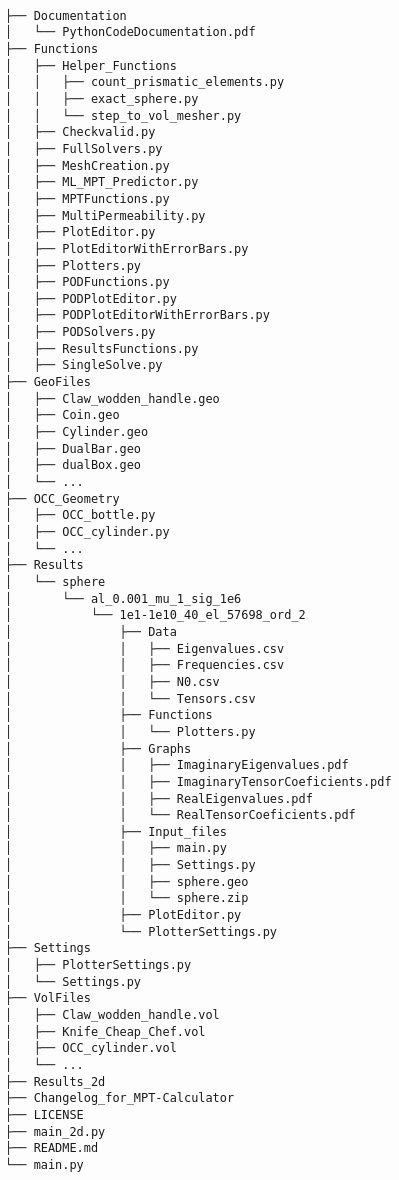 \clearpage
\begin{Verbatim}[fontsize=\footnotesize]

├── Documentation
│   └── PythonCodeDocumentation.pdf
├── Functions
│   ├── Helper_Functions
│   │   ├── count_prismatic_elements.py
│   │   ├── exact_sphere.py
│   │   └── step_to_vol_mesher.py
│   ├── Checkvalid.py
│   ├── FullSolvers.py
│   ├── MeshCreation.py
│   ├── ML_MPT_Predictor.py
│   ├── MPTFunctions.py
│   ├── MultiPermeability.py
│   ├── PlotEditor.py
│   ├── PlotEditorWithErrorBars.py
│   ├── Plotters.py
│   ├── PODFunctions.py
│   ├── PODPlotEditor.py
│   ├── PODPlotEditorWithErrorBars.py
│   ├── PODSolvers.py
│   ├── ResultsFunctions.py
│   ├── SingleSolve.py 
├── GeoFiles
│   ├── Claw_wodden_handle.geo
│   ├── Coin.geo
│   ├── Cylinder.geo
│   ├── DualBar.geo
│   ├── dualBox.geo
│   └── ...
├── OCC_Geometry
│   ├── OCC_bottle.py
│   ├── OCC_cylinder.py
│   └── ...
├── Results
│   └── sphere
│       └── al_0.001_mu_1_sig_1e6
│           └── 1e1-1e10_40_el_57698_ord_2
│               ├── Data
│               │   ├── Eigenvalues.csv
│               │   ├── Frequencies.csv
│               │   ├── N0.csv
│               │   └── Tensors.csv
│               ├── Functions
│               │   └── Plotters.py
│               ├── Graphs
│               │   ├── ImaginaryEigenvalues.pdf
│               │   ├── ImaginaryTensorCoeficients.pdf
│               │   ├── RealEigenvalues.pdf
│               │   └── RealTensorCoeficients.pdf
│               ├── Input_files
│               │   ├── main.py
│               │   ├── Settings.py
│               │   ├── sphere.geo
│               │   └── sphere.zip
│               ├── PlotEditor.py
│               └── PlotterSettings.py
├── Settings
│   ├── PlotterSettings.py
│   └── Settings.py
├── VolFiles
│   ├── Claw_wodden_handle.vol
│   ├── Knife_Cheap_Chef.vol
│   ├── OCC_cylinder.vol
│   └── ...
├── Results_2d
├── Changelog_for_MPT-Calculator
├── LICENSE
├── main_2d.py
├── README.md
└── main.py
\end{Verbatim}
\clearpage



